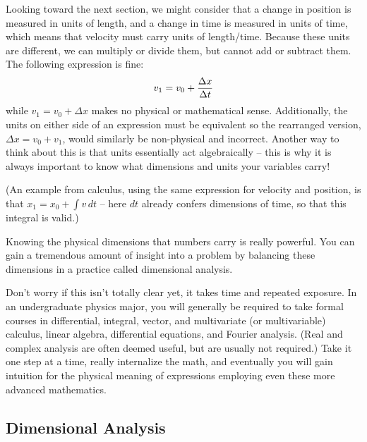 Looking toward the next section, we might consider that a change in position is measured in units of length, and a change in time is measured in units of time, which means that velocity must carry units of length/time. Because these units are different, we can multiply or divide them, but cannot add or subtract them. The following expression is fine:
\begin{equation}
   v_1 =  v_0 + \frac{\Delta x}{\Delta t} \notag
\end{equation}
while $v_1 = v_0 + \Delta x$ makes no physical or mathematical sense. Additionally, the units on either side of an expression must be equivalent so the rearranged version, $\Delta x = v_0 + v_1$, would similarly be non-physical and incorrect. Another way to think about this is that units essentially act algebraically -- this is why it is always important to know what dimensions and units your variables carry!

(An example from calculus, using the same expression for velocity and position, is that $x_1 = x_0 + \int v \, dt$ -- here $dt$ already confers dimensions of time, so that this integral is valid.)

Knowing the physical dimensions that numbers carry is really powerful. You can gain a tremendous amount of insight into a problem by balancing these dimensions in a practice called dimensional analysis.

Don't worry if this isn't totally clear yet, it takes time and repeated exposure. In an undergraduate physics major, you will generally be required to take formal courses in differential, integral, vector, and multivariate (or multivariable) calculus, linear algebra, differential equations, and Fourier analysis. (Real and complex analysis are often deemed useful, but are usually not required.) Take it one step at a time, really internalize the math, and eventually you will gain intuition for the physical meaning of expressions employing even these more advanced mathematics.


\subsection{Dimensional Analysis}

